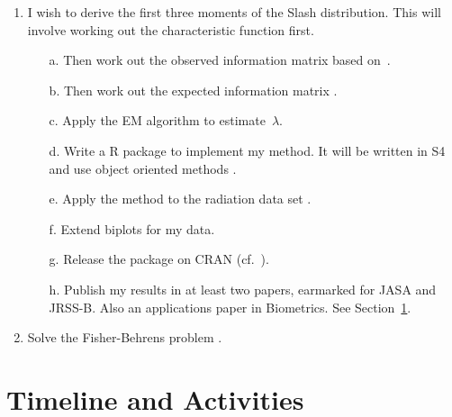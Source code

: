 \documentclass[12pt,a4paper]{article}
\begin{document}
\begin{enumerate}

\item
I wish to derive the first three moments of the Slash distribution.
This will involve working out the characteristic function first.


\begin{itemize}

\item[a.]
Then work out the observed information matrix
based on~\cite{bick:etal:2009}.

\item[b.]
Then work out the expected information matrix
\citep{scot:lee:wild:2007}.

\item[c.]
Apply the EM algorithm \citep{demp:lair:rubi:1977} to estimate~$\lambda$.

\item[d.]
Write a R package to implement my method.
It will be written in S4 and use object oriented methods
\citep{cham:1998}.

\item[e.]
Apply the method to the radiation data set
\citep{MR2526777}.

\item[f.]
Extend biplots \citep{gowe:1966} for my data.

\item[g.]
Release the package on CRAN
(cf.~\cite{murr:ihak:2000}).

\item[h.]
Publish my results in at least two papers,
earmarked for JASA and JRSS-B.
Also an applications paper in Biometrics.
See Section~\ref{sec:timeline}.

\end{itemize}



\item
Solve the Fisher-Behrens problem
\citep{efro:2009,MR2415600,MR2508377}.


\end{enumerate}







\section{Timeline and Activities}
\label{sec:timeline}
\end{document}

